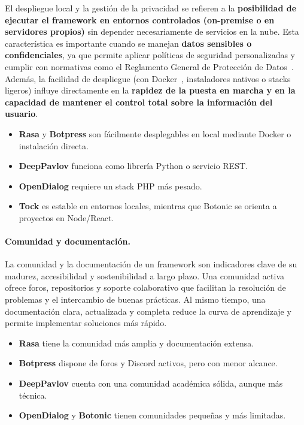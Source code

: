 El despliegue local y la gestión de la privacidad se refieren a la \textbf{posibilidad de ejecutar el framework en entornos controlados (on-premise o en servidores propios)} sin depender necesariamente de servicios en la nube. Esta característica es importante cuando se manejan \textbf{datos sensibles o confidenciales}, ya que permite aplicar políticas de seguridad personalizadas y cumplir con normativas como el Reglamento General de Protección de Datos~\cite{rgpd2016}. Además, la facilidad de despliegue (con Docker~\cite{docker2024}, instaladores nativos o stacks ligeros) influye directamente en la \textbf{rapidez de la puesta en marcha y en la capacidad de mantener el control total sobre la información del usuario}.

\begin{itemize}
    \item \textbf{Rasa} y \textbf{Botpress} son fácilmente desplegables en local mediante Docker o instalación directa.
    \item \textbf{DeepPavlov} funciona como librería Python o servicio REST.
    \item \textbf{OpenDialog} requiere un stack PHP más pesado.
    \item \textbf{Tock} es estable en entornos locales, mientras que Botonic se orienta a proyectos en Node/React.
\end{itemize}

\paragraph{Comunidad y documentación.}

La comunidad y la documentación de un framework son indicadores clave de su madurez, accesibilidad y sostenibilidad a largo plazo. Una comunidad activa ofrece foros, repositorios y soporte colaborativo que facilitan la resolución de problemas y el intercambio de buenas prácticas. Al mismo tiempo, una documentación clara, actualizada y completa reduce la curva de aprendizaje y permite implementar soluciones más rápido.

\begin{itemize}
    \item \textbf{Rasa} tiene la comunidad más amplia y documentación extensa.
    \item \textbf{Botpress} dispone de foros y Discord activos, pero con menor alcance.
    \item \textbf{DeepPavlov} cuenta con una comunidad académica sólida, aunque más técnica.
    \item \textbf{OpenDialog} y \textbf{Botonic} tienen comunidades pequeñas y más limitadas.
\end{itemize}

